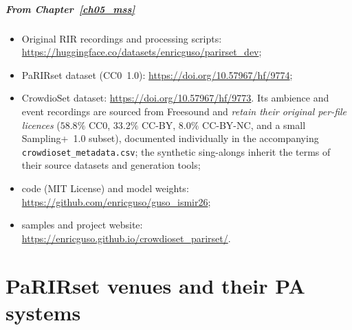 \paragraph{From Chapter~\ref{ch05_mss}}
\begin{itemize}
    \item Original \acrshort{RIR} recordings and processing scripts:
    \url{https://huggingface.co/datasets/enricguso/parirset_dev};
    \item PaRIRset dataset (CC0~1.0):
    \url{https://doi.org/10.57967/hf/9774};
    \item CrowdioSet dataset:
    \url{https://doi.org/10.57967/hf/9773}. Its ambience and event recordings
    are sourced from Freesound and \emph{retain their original per-file
    licences} ($58.8\%$ CC0, $33.2\%$ CC-BY, $8.0\%$ CC-BY-NC, and a
    small Sampling+~1.0 subset), documented individually in the accompanying
    \texttt{crowdioset\_metadata.csv}; the synthetic sing-alongs inherit the
    terms of their source datasets and generation tools;
    \item code (MIT License) and model weights:
    \url{https://github.com/enricguso/guso_ismir26};
    \item samples and project website:
    \url{https://enricguso.github.io/crowdioset_parirset/}.
\end{itemize}


\chapter{PaRIRset venues and their PA systems}
\label{app:parirset}

\setlength{\LTleft}{0pt}
\setlength{\LTright}{0pt}

